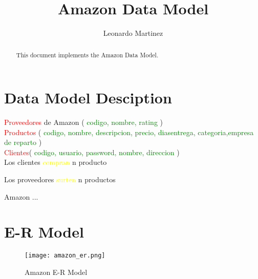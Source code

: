 \documentclass[10pt]{article}         %
\title{Amazon Data Model}
\author{Leonardo Martinez}
\begin{document}
\maketitle

\begin{abstract}
This document implements the Amazon Data Model.
\end{abstract}

\section{Data Model Desciption}


\textcolor{red}{Proveedores} de Amazon ( \textcolor{green}{codigo, nombre, rating} )\\

\textcolor{red}{Productos} ( \textcolor{green}{codigo, nombre, descripcion, precio, diasentrega, categoria,empresa de reparto} )
\\
\textcolor{red}{Clientes}( \textcolor{green}{ codigo, usuario, password, nombre, direccion} )\\

Los clientes \textcolor{yellow}{compran} n producto

Los proveedores \textcolor{yellow}{surten} n productos


Amazon ...
\section{E-R Model}
\begin{figure}[h]
     \texttt{[image: amazon\_er.png]}
     \caption{Amazon E-R Model}
\end{figure}
\end{document}
